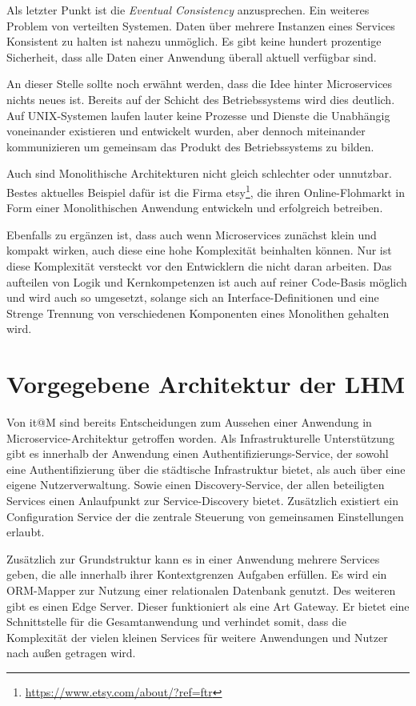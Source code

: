 \documentclass[12pt,a4paper,bibliography=totocnumbered,listof=totocnumbered]{scrartcl}
\begin{document}
Als letzter Punkt ist die \textit{Eventual Consistency} anzusprechen. Ein weiteres Problem von verteilten Systemen. Daten über mehrere Instanzen eines Services Konsistent zu halten ist nahezu unmöglich. Es gibt keine hundert prozentige Sicherheit, dass alle Daten einer Anwendung überall aktuell verfügbar sind.

An dieser Stelle sollte noch erwähnt werden, dass die Idee hinter Microservices nichts neues ist. Bereits auf der Schicht des Betriebssystems wird dies deutlich. Auf UNIX-Systemen laufen lauter keine Prozesse und Dienste die Unabhängig voneinander existieren und entwickelt wurden, aber dennoch miteinander kommunizieren um gemeinsam das Produkt des Betriebssystems zu bilden.\cite{hoff}

Auch sind Monolithische Architekturen nicht gleich schlechter oder unnutzbar. Bestes aktuelles Beispiel dafür ist die Firma etsy\footnote{\url{https://www.etsy.com/about/?ref=ftr}}, die ihren Online-Flohmarkt in Form einer Monolithischen Anwendung entwickeln und erfolgreich betreiben.

Ebenfalls zu ergänzen ist, dass auch wenn Microservices zunächst klein und kompakt wirken, auch diese eine hohe Komplexität beinhalten können. Nur ist diese Komplexität versteckt vor den Entwicklern die nicht daran arbeiten. Das aufteilen von Logik und Kernkompetenzen ist auch auf reiner Code-Basis möglich und wird auch so umgesetzt, solange sich an Interface-Definitionen und eine Strenge Trennung von verschiedenen Komponenten eines Monolithen gehalten wird.\cite{hoff}

\section{Vorgegebene Architektur der \acf{LHM}}\label{ch:arch-itm}

Von it@M sind bereits Entscheidungen zum Aussehen einer Anwendung in Microservice-Architektur getroffen worden. Als Infrastrukturelle Unterstützung gibt es innerhalb der Anwendung einen Authentifizierungs-Service, der sowohl eine Authentifizierung über die städtische Infrastruktur bietet, als auch über eine eigene Nutzerverwaltung. Sowie einen Discovery-Service, der allen beteiligten Services einen Anlaufpunkt zur Service-Discovery bietet. Zusätzlich existiert ein Configuration Service der die zentrale Steuerung von gemeinsamen Einstellungen erlaubt.

Zusätzlich zur Grundstruktur kann es in einer Anwendung mehrere Services geben, die alle innerhalb ihrer Kontextgrenzen Aufgaben erfüllen. Es wird ein ORM-Mapper zur Nutzung einer relationalen Datenbank genutzt. Des weiteren gibt es einen Edge Server. Dieser funktioniert als eine Art Gateway. Er bietet eine Schnittstelle für die Gesamtanwendung und verhindet somit, dass die Komplexität der vielen kleinen Services für weitere Anwendungen und Nutzer nach außen getragen wird.
\end{document}
